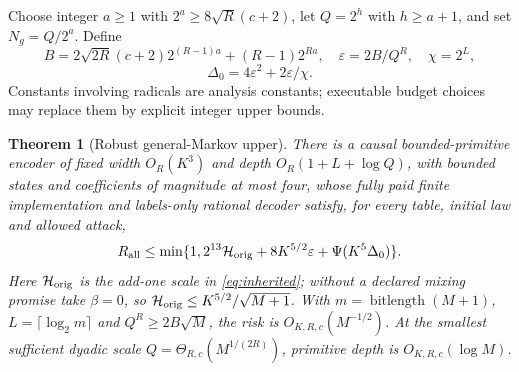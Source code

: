 \documentclass[11pt,letterpaper]{article}
\newtheorem{theorem}{Theorem}[section]
\theoremstyle{definition}\newtheorem{definition}[theorem]{Definition}
\theoremstyle{remark}\newtheorem{remark}[theorem]{Remark}
\begin{document}
Choose integer $a\ge1$ with $2^a\ge8\sqrt R(c+2)$, let $Q=2^h$ with $h\ge a+1$, and set $N_g=Q/2^a$. Define
\[
 B=2\sqrt{2R}(c+2)2^{(R-1)a}+(R-1)2^{Ra},\quad
 \varepsilon=2B/Q^R,\quad \chi=2^L,
\]
\[
 \Delta_0=4\varepsilon^2+2\varepsilon/\chi.
\]
Constants involving radicals are analysis constants; executable budget choices may replace them by explicit integer upper bounds.
\begin{theorem}[Robust general-Markov upper]\label{thm:robustmarkov}
There is a causal bounded-primitive encoder of fixed width $O_R(K^3)$ and depth $O_R(1+L+\log Q)$, with bounded states and coefficients of magnitude at most four, whose fully paid finite implementation and labels-only rational decoder satisfy, for every table, initial law and allowed attack,
\begin{equation}\label{eq:robustmarkovrisk}
 R_{\rm all}\le\min\{1,2^{13}\mathcal H_{\rm orig}
       +8K^{5/2}\varepsilon+\Psi(K^5\Delta_0)\}.
\end{equation}
Here $\mathcal H_{\rm orig}$ is the add-one scale in \eqref{eq:inherited}; without a declared mixing promise take $\beta=0$, so $\mathcal H_{\rm orig}\le K^{5/2}/\sqrt{M+1}$. With
$m=\operatorname{bitlength}(M+1)$, $L=\lceil\log_2m\rceil$ and $Q^R\ge2B\sqrt M$, the risk is $O_{K,R,c}(M^{-1/2})$. At the smallest sufficient dyadic scale $Q=\Theta_{R,c}(M^{1/(2R)})$, primitive depth is $O_{K,R,c}(\log M)$.
\end{theorem}
\end{document}
